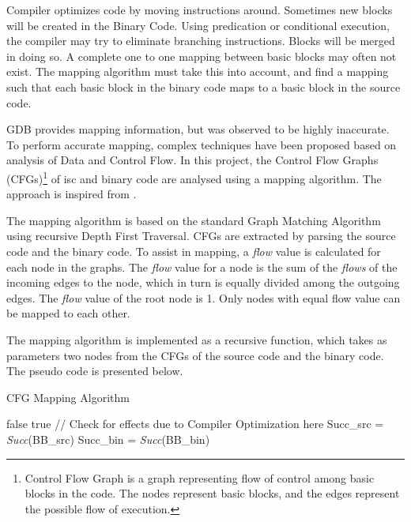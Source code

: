 Compiler optimizes code by moving instructions around. Sometimes new blocks will be created in the Binary Code. Using predication or conditional execution, the compiler may try to eliminate branching instructions. Blocks will be merged in doing so. A complete one to one mapping between basic blocks may often not exist. The mapping algorithm must take this into account, and find a mapping such that each basic block in the binary code maps to a basic block in the source code.

GDB provides mapping information, but was observed to be highly inaccurate. To perform accurate mapping, complex techniques have been proposed based on analysis of Data and Control Flow. In this project, the Control Flow Graphs (CFGs)\footnote{Control Flow Graph is a graph representing flow of control among basic blocks in the code. The nodes represent basic blocks, and the edges represent the possible flow of execution.} of \gls{isc} and binary code are analysed using a mapping algorithm. The approach is inspired from \cite{RBA2013}.

The mapping algorithm is based on the standard Graph Matching Algorithm using recursive Depth First Traversal. CFGs are extracted by parsing the source code and the binary code. To assist in mapping, a \textit{flow} value is calculated for each node in the graphs. The \textit{flow} value for a node is the sum of the \textit{flows} of the incoming edges to the node, which in turn is equally divided among the outgoing edges. The \textit{flow} value of the root node is 1. Only nodes with equal flow value can be mapped to each other.

The mapping algorithm is implemented as a recursive function, which takes as parameters two nodes from the CFGs of the source code and the binary code. The pseudo code is presented below. 


\begin{algorithm}[h!]
\caption{CFG Mapping Algorithm}\label{euclid}
\begin{algorithmic}[1]
 \Return false
\EndIf
{} \Return true
\EndIf
\State // Check for effects due to Compiler Optimization here
\State Succ\_src = \textit{Succ}(BB\_src)
\State Succ\_bin = \textit{Succ}(BB\_bin)

\EndFunction
\end{algorithmic}
\end{algorithm}

